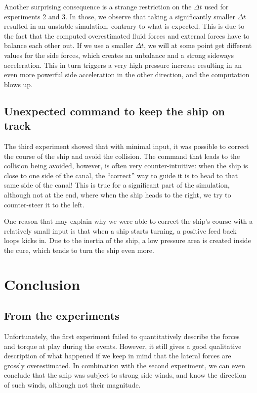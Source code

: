 \documentclass[a4paper]{article}
\begin{document}
Another surprising consequence is a strange restriction on the $\Delta t$ used for experiments 2 and 3. In those, we observe that taking a significantly smaller $\Delta t$ resulted in an unstable simulation, contrary to what is expected. This is due to the fact that the computed overestimated fluid forces and external forces have to balance each other out. If we use a smaller $\Delta t$, we will at some point get different values for the side forces, which creates an unbalance and a strong sideways acceleration. This in turn triggers a very high pressure increase resulting in an even more powerful side acceleration in the other direction, and the computation blows up.

\subsection{Unexpected command to keep the ship on track}
The third experiment showed that with minimal input, it was possible to correct the course of the ship and avoid the collision. The command that leads to the collision being avoided, however, is often very counter-intuitive: when the ship is close to one side of the canal, the ``correct'' way to guide it is to head to that same side of the canal! This is true for a significant part of the simulation, although not at the end, where when the ship heads to the right, we try to counter-steer it to the left. 

One reason that may explain why we were able to correct the ship's course with a relatively small input is that when a ship starts turning, a positive feed back loops kicks in. Due to the inertia of the ship, a low pressure area is created inside the cure, which tends to turn the ship even more. 

\section{Conclusion}
\subsection{From the experiments}
Unfortunately, the first experiment failed to quantitatively describe the forces and torque at play during the events. However, it still gives a good qualitative description of what happened if we keep in mind that the lateral forces are grossly overestimated. In combination with the second experiment, we can even conclude that the ship was subject to strong side winds, and know the direction of such winds, although not their magnitude.
\end{document}
